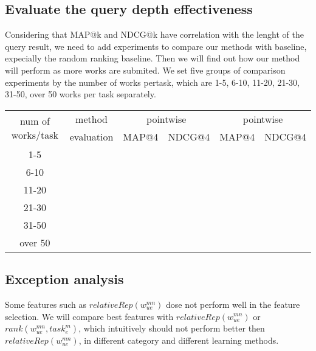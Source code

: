 \documentclass{sig-alternate-05-2015}
\begin{document}
\subsection{Evaluate the query depth effectiveness}
Considering that MAP@k and NDCG@k have correlation with the lenght of the query result, we need to add experiments to compare our methods with baseline, expecially the random ranking baseline. Then we will find out how our method will perform as more works are submited.
We set five groups of comparison experiments by the number of works pertask, which are 1-5, 6-10, 11-20, 21-30, 31-50, over 50 works per task separately.\\
\begin{tabular}{|c|c|c|c|c|c|}

\hline
\multirow{2}{*}{num of works/task}  & method  & \multicolumn{2}{c|}{pointwise}  & \multicolumn{2}{c|}{pointwise} \\
\cline{2-6}
 &evaluation&MAP@4&NDCG@4&MAP@4&NDCG@4 \\
\hline
1-5 & & & & &\\
\hline
6-10 & & & & &\\
\hline	
11-20 & & & & &\\
\hline
21-30 & & & & &\\
\hline
31-50 & & & & &\\
\hline
over 50 & & & & &\\
\hline
\end{tabular}
\subsection{Exception analysis}
Some features such as $relativeRep({w}_{ue}^{mn})$ dose not perform well in the feature selection. We will compare  best features with $relativeRep({w}_{ue}^{mn})$ or $rank({w}_{ue}^{mn}, {task}_{e}^{m})$, which intuitively should not perform better then $relativeRep({w}_{ue}^{mn})$, in different category and different learning methods. 
\end{document}
